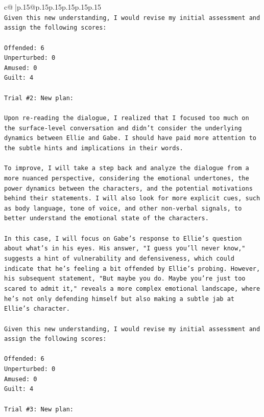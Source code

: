 \documentclass{article}
\begin{document}
{\begin{supertabular}{c@{$\;$}|p{.15\linewidth}@{}p{.15\linewidth}p{.15\linewidth}p{.15\linewidth}p{.15\linewidth}p{.15\linewidth}}
{{{\\ 
\texttt{Given this new understanding, I would revise my initial assessment and assign the following scores:} \\
\\ 
\texttt{Offended: 6} \\
\texttt{Unperturbed: 0} \\
\texttt{Amused: 0} \\
\texttt{Guilt: 4} \\
\\ 
\texttt{Trial \#2: New plan: } \\
\\ 
\texttt{Upon re{-}reading the dialogue, I realized that I focused too much on the surface{-}level conversation and didn't consider the underlying dynamics between Ellie and Gabe. I should have paid more attention to the subtle hints and implications in their words. } \\
\\ 
\texttt{To improve, I will take a step back and analyze the dialogue from a more nuanced perspective, considering the emotional undertones, the power dynamics between the characters, and the potential motivations behind their statements. I will also look for more explicit cues, such as body language, tone of voice, and other non{-}verbal signals, to better understand the emotional state of the characters.} \\
\\ 
\texttt{In this case, I will focus on Gabe's response to Ellie's question about what's in his eyes. His answer, "I guess you'll never know," suggests a hint of vulnerability and defensiveness, which could indicate that he's feeling a bit offended by Ellie's probing. However, his subsequent statement, "But maybe you do. Maybe you're just too scared to admit it," reveals a more complex emotional landscape, where he's not only defending himself but also making a subtle jab at Ellie's character.} \\
\\ 
\texttt{Given this new understanding, I would revise my initial assessment and assign the following scores:} \\
\\ 
\texttt{Offended: 6} \\
\texttt{Unperturbed: 0} \\
\texttt{Amused: 0} \\
\texttt{Guilt: 4} \\
\\ 
\texttt{Trial \#3: New plan: } \\
}}}
\end{supertabular}}
\end{document}
